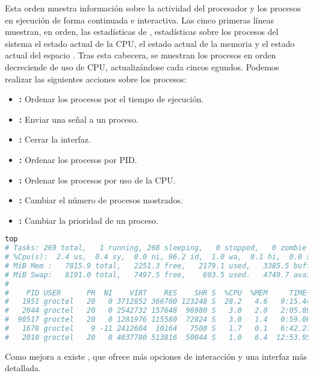 Esta orden muestra información sobre la actividad del procesador y los procesos en ejecución de forma continuada e interactiva.
Las cinco primeras líneas muestran, en orden, las estadísticas de , estadísticas sobre los procesos del sistema el estado actual de la CPU, el estado actual de la  memoria y el estado actual del espacio .
Tras esta cabecera, se muestran los procesos en orden decreciende de uso de CPU, actualizándose cada cincos egundos.
Podemos realizar las siguientes acciones sobre los procesos:

\begin{itemize}
	\item{}\textbf{:} Ordenar los procesos por el tiempo de ejecución.
	\item{}\textbf{:} Enviar una señal  a un proceso.
	\item{}\textbf{:} Cerrar la interfaz.
	\item{}\textbf{:} Ordenar los procesos por PID\@.
	\item{}\textbf{:} Ordenar los procesos por uso de la CPU\@.
	\item{}\textbf{:} Cambiar el número de procesos mostrados.
	\item{}\textbf{:} Cambiar la prioridad de un proceso.
\end{itemize}

\pagebreak

\begin{lstlisting}[language=Bash]
top
# Tasks: 269 total,   1 running, 268 sleeping,   0 stopped,   0 zombie
# %Cpu(s):  2.4 us,  0.4 sy,  0.0 ni, 96.2 id,  1.0 wa,  0.1 hi,  0.0 si,  0.0 st
# MiB Mem :   7815.9 total,   2251.3 free,   2179.1 used,   3385.5 buff/cache
# MiB Swap:   8191.0 total,   7497.5 free,    693.5 used.   4749.7 avail Mem
#
#    PID USER      PR  NI    VIRT    RES    SHR S  %CPU  %MEM     TIME+ COMMAND
#   1951 groctel   20   0 3712852 366700 123248 S  28.2   4.6   9:15.44 firefox
#   2044 groctel   20   0 2542732 157648  96980 S   3.0   2.0   2:05.89 Web Content
#  90517 groctel   20   0 1281976 115580  72024 S   3.0   1.4   0:59.06 mpv
#   1678 groctel    9 -11 2412604  10164   7500 S   1.7   0.1   6:42.27 pulseaudio
#   2010 groctel   20   0 4037780 513816  50044 S   1.0   6.4  12:53.95 telegram-deskto
\end{lstlisting}

Como mejora a  existe , que ofrece más opciones de interacción y una interfaz más detallada.


